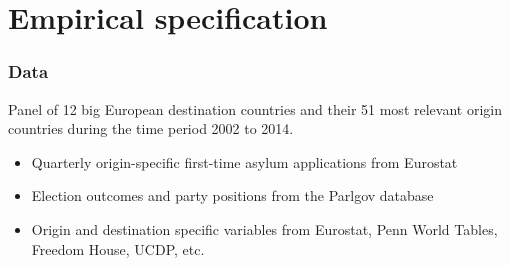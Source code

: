 \documentclass[compress, xcolor = {table,xcdraw}]{beamer}
\begin{document}
%	
%		
%
%

\section{Empirical specification}

\begin{frame}
\frametitle{Data}
Panel of 12 big European destination countries and their 51 most relevant origin countries during the time period 2002 to 2014.
\smallskip
\begin{itemize}
	\item Quarterly origin-specific first-time asylum applications from Eurostat
	\item Election outcomes and party positions from the Parlgov database
	\item Origin and destination specific variables from Eurostat, Penn World Tables, Freedom House, UCDP, etc.
\end{itemize}
\end{frame}
\end{document}
